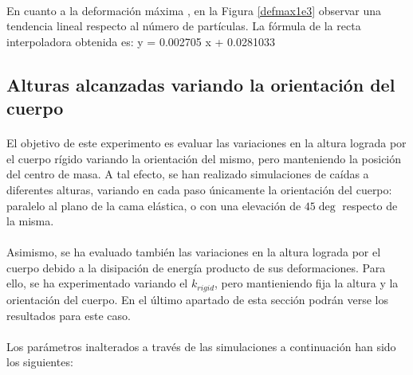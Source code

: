 \documentclass[12pt, twocolumn]{article}
\begin{document}
	\paragraph{} En cuanto a la deformación máxima , en la Figura \ref{defmax1e3} observar una tendencia  lineal respecto al número de partículas. La fórmula de la recta interpoladora obtenida es: y = 0.002705 x + 0.0281033
	
	\subsection{Alturas alcanzadas variando la orientación del cuerpo}
	
	\paragraph{} El objetivo de este experimento es evaluar las variaciones en la altura lograda por el cuerpo rígido variando la orientación del mismo, pero manteniendo la posición del centro de masa. A tal efecto, se han realizado simulaciones de caídas a diferentes alturas, variando en cada paso únicamente la orientación del cuerpo: paralelo al plano de la cama elástica, o con una elevación de $45\deg$ respecto de la misma.
	
	\paragraph{} Asimismo, se ha evaluado también las variaciones en la altura lograda por el cuerpo debido a la disipación de energía producto de sus deformaciones. Para ello, se ha experimentado variando el $k_{rigid}$, pero mantieniendo fija la altura y la orientación del cuerpo. En el último apartado de esta sección podrán verse los resultados para este caso. 
	
	\paragraph{} Los parámetros inalterados a través de las simulaciones a continuación han sido los siguientes:
	
\end{document}
